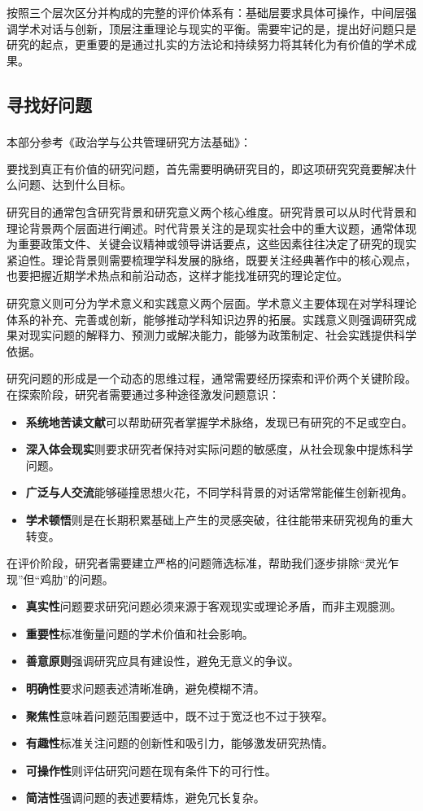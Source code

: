 按照三个层次区分并构成的完整的评价体系有：基础层要求具体可操作，中间层强调学术对话与创新，顶层注重理论与现实的平衡。需要牢记的是，提出好问题只是研究的起点，更重要的是通过扎实的方法论和持续努力将其转化为有价值的学术成果。

\subsection{寻找好问题}
本部分参考《政治学与公共管理研究方法基础》：\textsuperscript{\cite{2}}

要找到真正有价值的研究问题，首先需要明确研究目的，即这项研究究竟要解决什么问题、达到什么目标。

研究目的通常包含研究背景和研究意义两个核心维度。研究背景可以从时代背景和理论背景两个层面进行阐述。时代背景关注的是现实社会中的重大议题，通常体现为重要政策文件、关键会议精神或领导讲话要点，这些因素往往决定了研究的现实紧迫性。理论背景则需要梳理学科发展的脉络，既要关注经典著作中的核心观点，也要把握近期学术热点和前沿动态，这样才能找准研究的理论定位。

研究意义则可分为学术意义和实践意义两个层面。学术意义主要体现在对学科理论体系的补充、完善或创新，能够推动学科知识边界的拓展。实践意义则强调研究成果对现实问题的解释力、预测力或解决能力，能够为政策制定、社会实践提供科学依据。

研究问题的形成是一个动态的思维过程，通常需要经历探索和评价两个关键阶段。在探索阶段，研究者需要通过多种途径激发问题意识：

\begin{itemize}
	\item
	\textbf{系统地苦读文献}可以帮助研究者掌握学术脉络，发现已有研究的不足或空白。
	\item
	\textbf{深入体会现实}则要求研究者保持对实际问题的敏感度，从社会现象中提炼科学问题。
	\item
	\textbf{广泛与人交流}能够碰撞思想火花，不同学科背景的对话常常能催生创新视角。
	\item
	\textbf{学术顿悟}则是在长期积累基础上产生的灵感突破，往往能带来研究视角的重大转变。
\end{itemize}

在评价阶段，研究者需要建立严格的问题筛选标准，帮助我们逐步排除``灵光乍现''但``鸡肋''的问题。

\begin{itemize}
	\item
	\textbf{真实性}问题要求研究问题必须来源于客观现实或理论矛盾，而非主观臆测。
	\item
	\textbf{重要性}标准衡量问题的学术价值和社会影响。
	\item
	\textbf{善意原则}强调研究应具有建设性，避免无意义的争议。
	\item
	\textbf{明确性}要求问题表述清晰准确，避免模糊不清。
	\item
	\textbf{聚焦性}意味着问题范围要适中，既不过于宽泛也不过于狭窄。
	\item
	\textbf{有趣性}标准关注问题的创新性和吸引力，能够激发研究热情。
	\item
	\textbf{可操作性}则评估研究问题在现有条件下的可行性。
	\item
	\textbf{简洁性}强调问题的表述要精炼，避免冗长复杂。
\end{itemize}

